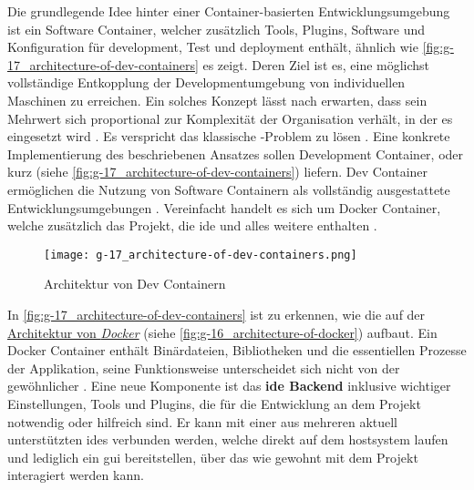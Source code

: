 Die grundlegende Idee hinter einer Container-basierten Entwicklungsumgebung ist ein Software Container, welcher zusätzlich Tools, Plugins, Software und Konfiguration für \Gls{development}, Test und \Gls{deployment} enthält, ähnlich wie \autoref{fig:g-17_architecture-of-dev-containers} es zeigt. Deren Ziel ist es, eine möglichst vollständige Entkopplung der Developmentumgebung von individuellen Maschinen zu erreichen. Ein solches Konzept lässt nach \citeauthor{014:Managing-Container-based-Software-Development-Environments} erwarten, dass sein Mehrwert sich proportional zur Komplexität der Organisation verhält, in der es eingesetzt wird \cite{014:Managing-Container-based-Software-Development-Environments}. Es verspricht das klassische -Problem zu lösen \cite{204:Development-Containers-Simplified}. Eine konkrete Implementierung des beschriebenen Ansatzes sollen Development Container, oder kurz  (siehe \autoref{fig:g-17_architecture-of-dev-containers}) liefern. Dev Container ermöglichen die Nutzung von Software Containern als vollständig ausgestattete Entwicklungsumgebungen \cite{303:Introduction-to-DevContainers,305:Using-DevContainers-in-JetBrains-IDEs,306:Development-Containers}. Vereinfacht handelt es sich um Docker Container, welche zusätzlich das Projekt, die \Gls{ide} und alles weitere enthalten \cite{305:Using-DevContainers-in-JetBrains-IDEs}.

\begin{figure}[h]
    \centering
    \texttt{[image: g-17\_architecture-of-dev-containers.png]}
    \caption{Architektur von Dev Containern}
    \label{fig:g-17_architecture-of-dev-containers}
\end{figure}

In \autoref{fig:g-17_architecture-of-dev-containers} ist zu erkennen, wie die  auf der \hyperref[fig:g-16_architecture-of-docker]{Architektur von \textit{Docker}} (siehe \autoref{fig:g-16_architecture-of-docker}) aufbaut. Ein Docker Container enthält Binärdateien, Bibliotheken und die essentiellen Prozesse der Applikation, seine Funktionsweise unterscheidet sich nicht von der gewöhnlicher . Eine neue Komponente ist das \textbf{\Gls{ide} Backend} inklusive wichtiger Einstellungen, Tools und Plugins, die für die Entwicklung an dem Projekt notwendig oder hilfreich sind. Er kann mit einer aus mehreren aktuell unterstützten \Glspl{ide} verbunden werden, welche direkt auf dem \Gls{hostsystem} laufen und lediglich ein \Gls{gui} bereitstellen, über das wie gewohnt mit dem Projekt interagiert werden kann.

